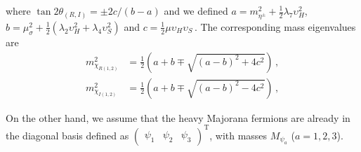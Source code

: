 \documentclass[12pt]{article}
\begin{document}
%
where $\tan2\theta_{(R,I)} = \pm2c/(b-a)$ and we defined $a = m^{2}_{\eta^{\pm}} + \frac{1}{2}\lambda_{7} \upsilon^{2}_{H}$, $b = \mu^{2}_{\sigma}+\frac{1}{2}(\lambda_{2} \upsilon^{2}_{H} + \lambda_{4} \upsilon^{2}_{S})$ and $c = \frac{1}{2}\mu \upsilon_{H} \upsilon_{S}$\,. The corresponding mass eigenvalues are
\begin{align*}
    m_{\chi_{R(1,2)}}^{2} &= \frac{1}{2} \left(a + b \mp \sqrt{(a-b)^{2} + 4c^{2}} \right)\,, \\
     m_{\chi_{I(1,2)}}^{2} &= \frac{1}{2} \left(a + b \mp \sqrt{(a-b)^{2} - 4c^{2}} \right)\,,
\end{align*}

On the other hand, we assume that the heavy Majorana fermions are already in the diagonal basis defined as $
\begin{pmatrix}
  \psi_1 &
  \psi_2 &
  \psi_3
\end{pmatrix}^{\operatorname{T}}
$, with masses $M_{\psi_a}$ ($a=1,2,3$).
\end{document}
